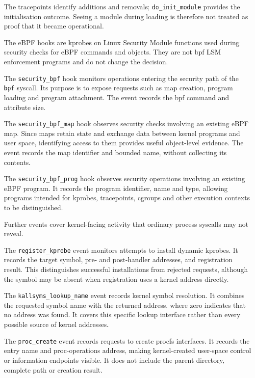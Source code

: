 The tracepoints identify additions and removals;
\texttt{do\_init\_module} provides the initialisation outcome. Seeing a module
during loading is therefore not treated as proof that it became operational.

The eBPF hooks are kprobes on Linux Security Module functions used during
security checks for eBPF commands and objects. They are not \gls{bpf} LSM
enforcement programs and do not change the decision.

The \texttt{security\_bpf} hook monitors operations entering the security path
of the \texttt{\gls{bpf}} syscall. Its purpose is to expose requests such as map
creation, program loading and program attachment. The event records the \gls{bpf}
command and attribute size.

The \texttt{security\_bpf\_map} hook observes security checks involving an
existing eBPF map. Since maps retain state and exchange data between kernel
programs and user space, identifying access to them provides useful
object-level evidence. The event records the map identifier and bounded name,
without collecting its contents.

The \texttt{security\_bpf\_prog} hook observes security operations involving an
existing eBPF program. It records the program identifier, name and type,
allowing programs intended for kprobes, tracepoints, cgroups and other
execution contexts to be distinguished.

Further events cover kernel-facing activity that ordinary process syscalls may
not reveal.

The \texttt{register\_kprobe} event monitors attempts to install dynamic
kprobes. It records the target symbol, pre- and post-handler addresses, and
registration result. This distinguishes successful installations from rejected
requests, although the symbol may be absent when registration uses a kernel
address directly.

The \texttt{kallsyms\_lookup\_}\allowbreak\texttt{name} event records kernel
symbol resolution. It combines the requested symbol name with the returned
address, where zero indicates that no address was found. It covers this
specific lookup interface rather than every possible source of kernel
addresses.

The \texttt{proc\_create} event records requests to create procfs interfaces.
It records the entry name and proc-operations address, making kernel-created
user-space control or information endpoints visible. It does not include the
parent directory, complete path or creation result.

